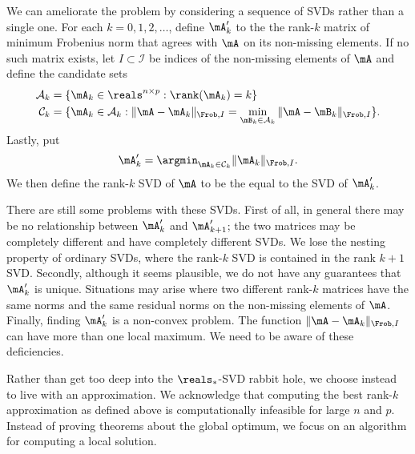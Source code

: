 We can ameliorate the problem by considering a sequence of SVDs rather than a 
single one.  For each $k = 0, 1, 2, \ldots$, define $\mA_k'$ to the the 
rank-$k$ matrix of minimum Frobenius norm that agrees with $\mA$ on its 
non-missing elements.  If no such matrix exists, let $I \subset \mathcal{I}$ 
be indices of the non-missing elements of $\mA$ and define the candidate
sets
\begin{align*}
    \mathcal{A}_k 
        &= \{ \mA_k \in \reals^{n \times p} : \rank(\mA_k) = k \} \\
    \mathcal{C}_k
        &= \{ \mA_k \in  \mathcal{A}_k 
                : \| \mA - \mA_k \|_{\Frob,I}
                  =
                  \min_{\mB_k \in \mathcal{A}_k} 
                      \| \mA - \mB_k \|_{\Frob,I} \}.
\end{align*}
Lastly, put
\[
    \mA'_k
        = \argmin_{\mA_k \in \mathcal{C}_k}
            \| \mA_k \|_{\Frob,I}.
\]
We then define the rank-$k$ SVD of $\mA$ to be the equal to the SVD of 
$\mA'_k$.  

There are still some problems with these SVDs. First of all, in general there
may be no relationship between $\mA_k'$ and $\mA_{k+1}'$; the two matrices may
be completely different and have completely different SVDs. We lose the
nesting property of ordinary SVDs, where the rank-$k$ SVD is contained in the
rank $k+1$ SVD. Secondly, although it seems plausible, we do not have any
guarantees that $\mA_k'$ is unique. Situations may arise where two different
rank-$k$ matrices have the same norms and the same residual norms on the
non-missing elements of $\mA$. Finally, finding $\mA'_k$ is a non-convex
problem. The function $\| \mA - \mA_k \|_{\Frob,I}$ can have more than one
local maximum.  We need to be aware of these deficiencies.

Rather than get too deep into the $\reals_\ast$-SVD rabbit hole, we choose
instead to live with an approximation. We acknowledge that computing the best
rank-$k$ approximation as defined above is computationally infeasible for
large $n$ and $p$. Instead of proving theorems about the global optimum, we
focus on an algorithm for computing a local solution.

